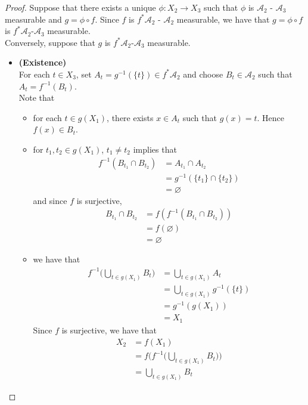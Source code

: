 \documentclass{book}
\theoremstyle{definition}
\newcommand{\MA}{\mathcal{A}}
\DeclareMathOperator*{\0}{\mbf{0}}
\DeclareMathOperator*{\1}{\mbf{1}}
\begin{document}
	\begin{proof}
		Suppose that there exists a unique $\phi: X_2 \rightarrow X_3$ such that $\phi$ is $\MA_2$ - $\MA_3$ measurable and $g = \phi \circ f$. Since $f$ is $f^* \MA_2$ - $\MA_2$ measurable, we have that $g = \phi \circ f$ is $f^*\MA_2$-$\MA_3$ measurable.  \\
		Conversely, suppose that $g$ is $f^*\MA_2$-$\MA_3$ measurable. \\
		\begin{itemize}
			\item \textbf{(Existence)} \\
			For each $t \in X_3$, set $A_t = g^{-1}(\{t\}) \in f^* \MA_2$ and choose $B_t \in \MA_2$ such that $A_t = f^{-1}(B_t)$. \\
			Note that 
			\begin{itemize}
				\item for each $t \in g(X_1)$, there exists $x \in A_t$ such that $g(x) = t$. Hence $f(x) \in B_t$.\\
				\item for $t_1, t_2 \in g(X_1)$, $t_1 \neq t_2$ implies that
				\begin{align*}
					f^{-1}(B_{t_1} \cap B_{t_2}) 
					&= A_{t_1} \cap A_{t_2} \\
					&= g^{-1}(\{t_1\} \cap \{t_2\}) \\
					&= \varnothing
				\end{align*}	 
				and since $f$ is surjective, 
				\begin{align*}
					B_{t_1} \cap  B_{t_2} 
					& = f(f^{-1}(B_{t_1} \cap  B_{t_2} )) \\
					&= f(\varnothing) \\
					&= \varnothing
				\end{align*}
				\item we have that 
				\begin{align*}
					f^{-1} \bigg( \bigcup_{t \in g(X_1)} B_t\bigg) 
					&=  \bigcup_{t \in g(X_1)} A_t \\
					&= \bigcup_{t \in g(X_1)} g^{-1}(\{t\}) \\
					&= g^{-1}(g(X_1)) \\
					&= X_1
				\end{align*}
				Since $f$ is surjective, we have that 
				\begin{align*}
					X_2
					&= f(X_1) \\
					&= f \bigg( f^{-1} \bigg( \bigcup_{t \in g(X_1)} B_t\bigg)  \bigg) \\
					&= \bigcup_{t \in g(X_1)} B_t

\end{align*}
\end{itemize}
\end{itemize}
\end{proof}
\end{document}
